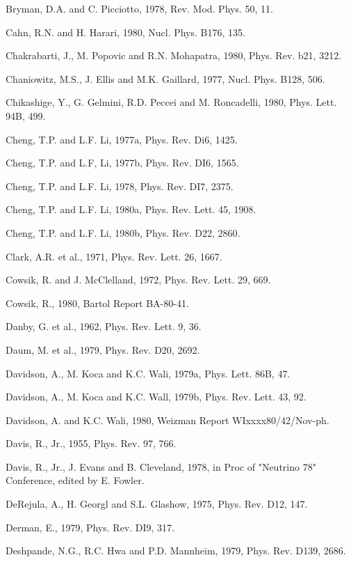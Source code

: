\documentclass[twoside]{article}
\begin{document}
{{{{{{{{{{{{{{{{\begin{thebibliography}{10}
\bibitem{}
Bryman, D.A. and C. Picciotto, 1978, Rev. Mod. Phys. 50, 11.

\bibitem{}
Cahn, R.N. and H. Harari, 1980, Nucl. Phys. B176, 135.

\bibitem{}
Chakrabarti, J., M. Popovic and R.N. Mohapatra, 1980, Phys. Rev. b21, 3212.

\bibitem{}
Chaniowitz, M.S., J. Ellis and M.K. Gaillard, 1977, Nucl. Phys. B128, 506.

\bibitem{}
Chikashige, Y., G. Gelmini, R.D. Peccei and M. Roncadelli, 1980, Phys. Lett. 94B, 499.

\bibitem{}
Cheng, T.P. and L.F. Li, 1977a, Phys. Rev. Di6, 1425.

\bibitem{}
Cheng, T.P. and L.F, Li, 1977b, Phys. Rev. DI6, 1565.

\bibitem{}
Cheng, T.P. and L.F. Li, 1978, Phys. Rev. DI7, 2375.

\bibitem{}
Cheng, T.P. and L.F. Li, 1980a, Phys. Rev. Lett. 45, 1908.

\bibitem{}
Cheng, T.P. and L.F. Li, 1980b, Phys. Rev. D22, 2860.

\bibitem{}
Clark, A.R. et al., 1971, Phys. Rev. Lett. 26, 1667.

\bibitem{}
Cowsik, R. and J. McClelland, 1972, Phys. Rev. Lett. 29, 669.

\bibitem{}
Cowsik, R., 1980, Bartol Report BA-80-41.

\bibitem{}
Danby, G. et al., 1962, Phys. Rev. Lett. 9, 36.

\bibitem{}
Daum, M. et al., 1979, Phys. Rev. D20, 2692.

\bibitem{}
Davidson, A., M. Koca and K.C. Wali, 1979a, Phys. Lett. 86B, 47.

\bibitem{}
Davidson, A., M. Koca and K.C. Wall, 1979b, Phys. Rev. Lett. 43, 92.

\bibitem{}
Davidson, A. and K.C. Wali, 1980, Weizman Report WIxxxx80/42/Nov-ph.

\bibitem{}
Davis, R., Jr., 1955, Phys. Rev. 97, 766.

\bibitem{}
Davis, R., Jr., J. Evans and B. Cleveland, 1978, in Proc of "Neutrino 78" Conference, edited by E. Fowler.

\bibitem{}
DeRejula, A., H. Georgl and S.L. Glashow, 1975, Phys. Rev. D12, 147.

\bibitem{}
Derman, E., 1979, Phys. Rev. DI9, 317.

\bibitem{}
Deshpande, N.G., R.C. Hwa and P.D. Mannheim, 1979, Phys. Rev. D139, 2686.


\end{thebibliography}}}}}}}}}}}}}}}}}
\end{document}
